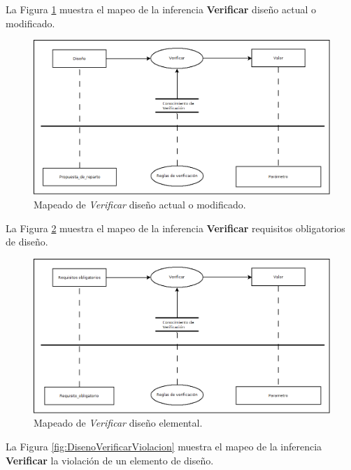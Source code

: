 La Figura \ref{fig:DisenoVerificarValor} muestra el mapeo de la inferencia \textbf{Verificar} diseño actual o modificado.

\begin{figure}[H]
  \centering
  \includegraphics[scale=0.35]{imaxes/DisenoVerificarValor.png}
  \caption{\label{fig:DisenoVerificarValor}Mapeado de \textit{Verificar} diseño actual o modificado.}
\end{figure}

La Figura \ref{fig:RequisitosObligatoriosVerificarValor} muestra el mapeo de la inferencia \textbf{Verificar} requisitos obligatorios de diseño.

\begin{figure}[H]
  \centering
  \includegraphics[scale=0.35]{imaxes/RequisitosObligatoriosVerificarValor.png}
  \caption{\label{fig:RequisitosObligatoriosVerificarValor}Mapeado de \textit{Verificar} diseño elemental.}
\end{figure}

La Figura \ref{fig:DisenoVerificarViolacion} muestra el mapeo de la inferencia \textbf{Verificar} la violación de un elemento de diseño.

